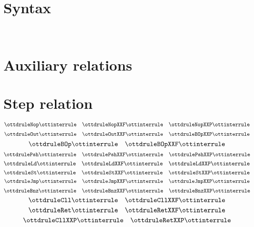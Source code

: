 \documentclass{article}
\begin{document}
\section*{Syntax}

\ottmetavars\\[3ex]

\ottgrammartabular{
\ottn\ottinterrule
\ottL\ottinterrule
\otta\ottinterrule
\ottinstr\ottinterrule
\ottS\ottinterrule
}

\section*{Auxiliary relations}

\ottgrammartabular{
\ottformula\ottinterrule
}

\section*{Step relation}

\small

\[ \ottdruleNop \ottinterrule 
   \quad \ottdruleNopXXF \ottinterrule 
   \quad \ottdruleNopXXP \ottinterrule \]
\[ \ottdruleOut \ottinterrule
   \quad  \ottdruleOutXXF \ottinterrule 
   \quad \ottdruleBOpXXP \ottinterrule \]
\[ \ottdruleBOp \ottinterrule
   \quad \ottdruleBOpXXF \ottinterrule \]
\[ \ottdrulePsh \ottinterrule 
   \quad \ottdrulePshXXF \ottinterrule
   \quad \ottdrulePshXXP \ottinterrule \]
 \[ \ottdruleLd \ottinterrule 
   \quad \ottdruleLdXXF \ottinterrule
   \quad \ottdruleLdXXP \ottinterrule \]
\[ \ottdruleSt \ottinterrule
   \quad \ottdruleStXXF \ottinterrule
   \quad \ottdruleStXXP \ottinterrule \]
\[ \ottdruleJmp \ottinterrule
   \quad \ottdruleJmpXXF \ottinterrule 
   \quad \ottdruleJmpXXP \ottinterrule \]
\[ \ottdruleBnz \ottinterrule 
   \quad  \ottdruleBnzXXF \ottinterrule
   \quad  \ottdruleBnzXXP \ottinterrule  \] 
\[ \ottdruleCll \ottinterrule
   \quad  \ottdruleCllXXF \ottinterrule \]
\[ \ottdruleRet \ottinterrule   
   \quad  \ottdruleRetXXF \ottinterrule \]
\[ \ottdruleCllXXP \ottinterrule 
   \quad \ottdruleRetXXP \ottinterrule \] 

\end{document}
